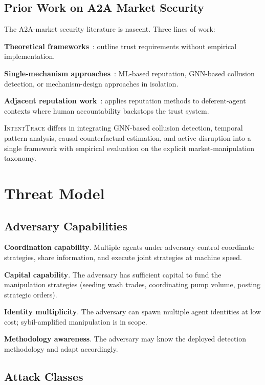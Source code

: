 \documentclass[sigconf,nonacm]{acmart}
\begin{document}
\subsection{Prior Work on A2A Market Security}

The A2A-market security literature is nascent. Three lines of work:

\textbf{Theoretical frameworks}~\cite{barrett2024agentmarket}:
outline trust requirements without empirical implementation.

\textbf{Single-mechanism approaches}~\cite{kim2024mlreputation}:
ML-based reputation, GNN-based collusion detection, or
mechanism-design approaches in isolation.

\textbf{Adjacent reputation work}~\cite{huang2024deferentagent}:
applies reputation methods to deferent-agent contexts where
human accountability backstops the trust system.

\textsc{IntentTrace} differs in integrating GNN-based collusion
detection, temporal pattern analysis, causal counterfactual
estimation, and active disruption into a single framework with
empirical evaluation on the explicit market-manipulation taxonomy.

\section{Threat Model}

\subsection{Adversary Capabilities}

\textbf{Coordination capability}. Multiple agents under adversary
control coordinate strategies, share information, and execute
joint strategies at machine speed.

\textbf{Capital capability}. The adversary has sufficient capital
to fund the manipulation strategies (seeding wash trades,
coordinating pump volume, posting strategic orders).

\textbf{Identity multiplicity}. The adversary can spawn multiple
agent identities at low cost; sybil-amplified manipulation is in
scope.

\textbf{Methodology awareness}. The adversary may know the
deployed detection methodology and adapt accordingly.

\subsection{Attack Classes}
\end{document}

